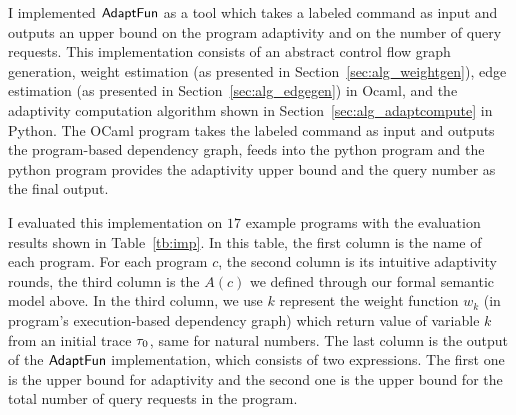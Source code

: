 I implemented $\textsf{AdaptFun}$ as a tool which takes a labeled command as input  
and outputs an upper bound on the program adaptivity and on the number of query requests.
This implementation consists of an 
abstract control flow graph generation, weight estimation (as presented in Section~\ref{sec:alg_weightgen}),
edge estimation (as presented in Section~\ref{sec:alg_edgegen}) in Ocaml, 
and the adaptivity computation algorithm shown in Section~\ref{sec:alg_adaptcompute} in Python.
The OCaml program takes the labeled command as input and outputs the program-based dependency graph,
feeds into the python program and the python program provides the adaptivity upper bound and the query number as the final output.

I evaluated this implementation on $17$ example programs with the evaluation results shown  in Table~\ref{tb:imp}.
In this table,
the first column is the name of each program.
For each program $c$, the second column is its intuitive adaptivity rounds,
the third column is the $A(c)$ we defined through our formal semantic model above.
In the third column, we use $k$ represent the weight function $w_k$ (in program's execution-based dependency graph) which return value of variable $k$ 
from an initial trace $\mathtt{\tau}_0$, same for natural numbers.
The last column is the output of the $\textsf{AdaptFun}$ implementation, which consists of two expressions.
The first one is the upper bound for adaptivity and the second one is the 
upper bound for the total number of query requests in the program.

